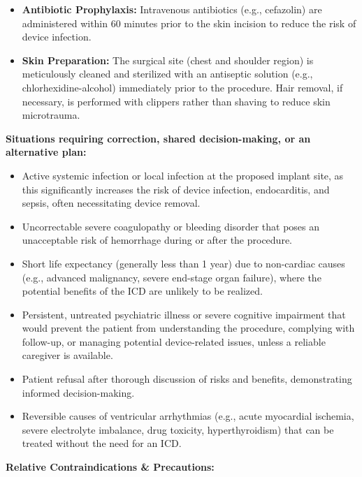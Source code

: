 \begin{itemize}
  \item \textbf{Antibiotic Prophylaxis:} Intravenous antibiotics (e.g., cefazolin) are administered within 60 minutes prior to the skin incision to reduce the risk of device infection.
  
  \item \textbf{Skin Preparation:} The surgical site (chest and shoulder region) is meticulously cleaned and sterilized with an antiseptic solution (e.g., chlorhexidine-alcohol) immediately prior to the procedure. Hair removal, if necessary, is performed with clippers rather than shaving to reduce skin microtrauma.
\end{itemize}

\textbf{Situations requiring correction, shared decision-making, or an alternative plan:}

\begin{itemize}
  \item Active systemic infection or local infection at the proposed implant site, as this significantly increases the risk of device infection, endocarditis, and sepsis, often necessitating device removal.
  
  \item Uncorrectable severe coagulopathy or bleeding disorder that poses an unacceptable risk of hemorrhage during or after the procedure.
  
  \item Short life expectancy (generally less than 1 year) due to non-cardiac causes (e.g., advanced malignancy, severe end-stage organ failure), where the potential benefits of the ICD are unlikely to be realized.
  
  \item Persistent, untreated psychiatric illness or severe cognitive impairment that would prevent the patient from understanding the procedure, complying with follow-up, or managing potential device-related issues, unless a reliable caregiver is available.
  
  \item Patient refusal after thorough discussion of risks and benefits, demonstrating informed decision-making.
  
  \item Reversible causes of ventricular arrhythmias (e.g., acute myocardial ischemia, severe electrolyte imbalance, drug toxicity, hyperthyroidism) that can be treated without the need for an ICD.
\end{itemize}

\textbf{Relative Contraindications \& Precautions:}


